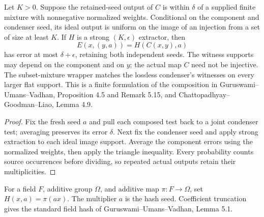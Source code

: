 \begin{theorem}
  \label{thm:lowerbounds-algebraic-strong-composition}
  \leanok
  Let $K>0$. Suppose the retained-seed output of $C$ is within $\delta$
  of a supplied finite mixture with nonnegative normalized weights.
  Conditional on the component and condenser seed, its ideal output is
  uniform on the image of an injection from a set of size at least $K$.
  If $H$ is a strong $(K,\epsilon)$ extractor, then
  \[
    E(x,(y,a))=H(C(x,y),a)
  \]
  has error at most $\delta+\epsilon$, retaining both independent seeds.
  The witness supports may depend on the component and on $y$; the actual
  map $C$ need not be injective. The subset-mixture wrapper matches the
  lossless condenser's witnesses on every larger flat support. This is a
  finite formulation of the composition in Guruswami--Umans--Vadhan,
  Proposition 4.5 and Remark 5.15, and Chattopadhyay--Goodman--Liao,
  Lemma 4.9.
\end{theorem}
\begin{proof}
  \leanok
  Fix the fresh seed $a$ and pull each composed test back to a joint
  condenser test; averaging preserves its error $\delta$. Next fix the
  condenser seed and apply strong extraction to each ideal image support.
  Average the component errors using the normalized weights, then apply
  the triangle inequality. Every probability counts source occurrences
  before dividing, so repeated actual outputs retain their multiplicities.
\end{proof}

\begin{definition}
  \label{def:lowerbounds-algebraic-field-hashing}
  \leanok
  For a field $F$, additive group $\Omega$, and additive map
  $\pi:F\to\Omega$, set $H(x,a)=\pi(ax)$. The multiplier $a$ is the
  hash seed. Coefficient truncation gives the standard field hash of
  Guruswami--Umans--Vadhan, Lemma 5.1.
\end{definition}

